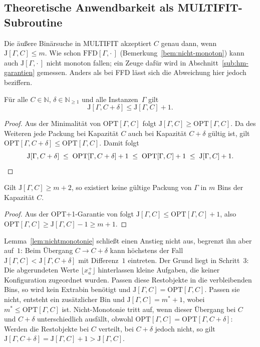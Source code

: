 \subsection{Theoretische Anwendbarkeit als MULTIFIT-Subroutine}
\label{sub:anwendbarkeit}

Die äußere Binärsuche in MULTIFIT akzeptiert $C$ genau dann, wenn $\mathrm{J}[\Gamma, C] \le m$.
Wie schon $\mathrm{FFD}[\Gamma, \cdot\,]$ (Bemerkung~\ref{bem:nicht-monoton}) kann auch
$\mathrm{J}[\Gamma, \cdot\,]$ nicht monoton fallen; ein Zeuge dafür wird in
Abschnitt~\ref{sub:hm-garantien} gemessen.
Anders als bei FFD lässt sich die Abweichung hier jedoch beziffern.

\begin{lemma}
\label{lem:nichtmonotonie}
	Für alle $C \in \mathbb{N}$, $\delta \in \mathbb{N}_{\ge 1}$ und alle Instanzen~$\Gamma$ gilt
  \[
    \mathrm{J}[\Gamma, C + \delta] \le \mathrm{J}[\Gamma, C] + 1.
  \]
\end{lemma}

\begin{proof}
  Aus der Minimalität von $\mathrm{OPT}[\Gamma, C]$ folgt $\mathrm{J}[\Gamma, C] \ge \mathrm{OPT}[\Gamma, C]$.
  Da des Weiteren jede Packung bei Kapazität $C$ auch bei Kapazität $C+\delta$ gültig ist, gilt
  $\mathrm{OPT}[\Gamma, C+\delta] \le \mathrm{OPT}[\Gamma, C]$. Damit folgt
  \[
    \mathrm{J}[\Gamma, C+\delta] \;\le\; \mathrm{OPT}[\Gamma, C+\delta] + 1 \;\le\; \mathrm{OPT}[\Gamma, C] + 1 \;\le\; \mathrm{J}[\Gamma, C] + 1. \qedhere
  \]
\end{proof}

\begin{korollar}
\label{kor:verwurf}
  Gilt $\mathrm{J}[\Gamma, C] \ge m+2$, so existiert keine gültige Packung von $\Gamma$ in $m$ Bins der Kapazität $C$.
\end{korollar}

\begin{proof}
  Aus der OPT+1-Garantie von \textcite{jansen_solisoba2010} folgt $\mathrm{J}[\Gamma, C] \le \mathrm{OPT}[\Gamma, C] + 1$,
  also $\mathrm{OPT}[\Gamma, C] \ge \mathrm{J}[\Gamma, C] - 1 \ge m+1$. \qedhere
\end{proof}

Lemma~\ref{lem:nichtmonotonie} schließt einen Anstieg nicht aus, begrenzt ihn aber auf~$1$:
Beim Übergang $C \to C+\delta$ kann höchstens der Fall
$\mathrm{J}[\Gamma, C] < \mathrm{J}[\Gamma, C+\delta]$ mit Differenz~$1$ eintreten.
Der Grund liegt in Schritt~3: Die abgerundeten Werte $\lfloor x^+_{a} \rfloor$ hinterlassen kleine Aufgaben, die keiner Konfiguration zugeordnet wurden.
Passen diese Restobjekte in die verbleibenden Bins,
so wird kein Extrabin benötigt und $\mathrm{J}[\Gamma, C] = \mathrm{OPT}[\Gamma, C]$.
Passen sie nicht, entsteht ein zusätzlicher Bin und $\mathrm{J}[\Gamma, C] = m^*+1$, wobei
$m^* \le \mathrm{OPT}[\Gamma, C]$ ist.
Nicht-Monotonie tritt auf, wenn dieser Übergang bei $C$ und $C+\delta$ unterschiedlich ausfällt,
obwohl $\mathrm{OPT}[\Gamma, C] = \mathrm{OPT}[\Gamma, C+\delta]$: Werden die Restobjekte bei $C$ verteilt, bei $C+\delta$ jedoch nicht,
so gilt $\mathrm{J}[\Gamma, C+\delta] = \mathrm{J}[\Gamma, C]+1 > \mathrm{J}[\Gamma, C]$.

